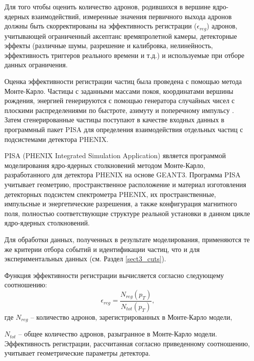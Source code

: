 Для того чтобы оценить количество адронов, родившихся в вершине ядро-ядерных взаимодействий, измеренные значения первичного выхода адронов должны быть скорректированы на эффективность регистрации ($\epsilon_{reg}$) адронов, учитывающей ограниченный аксептанс времяпролетной камеры, детекторные эффекты (различные шумы, разрешение и калибровка, нелинейность, эффективность триггеров реального времени и т.д.) и используемые при отборе данных ограничения.

Оценка эффективности регистрации частиц была проведена с помощью метода Монте-Карло.
Частицы с заданными массами покоя, координатами вершины рождения, энергией генерируются с помощью генератора  случайных чисел с плоскими распределениями по быстроте, азимуту и поперечному импульсу \pt. Затем сгенерированные частицы поступают в качестве входных данных в программный пакет PISA для определения взаимодействия отдельных частиц с подсистемами детектора PHENIX. 

PISA (PHENIX Integrated Simulation Application) является программой моделирования ядро-ядерных столкновений методом Монте-Карло, разработанного для детектора PHENIX на основе GEANT3.
Программа PISA учитывает геометрию, пространственное расположение и материал изготовления детекторных подсистем спектрометра PHENIX, их пространственные, импульсные и энергетические разрешения, а также конфигурация магнитного поля, полностью соответствующие структуре реальной установки в данном цикле ядро-ядерных столкновений.

Для обработки данных, полученных в результате моделирования, применяются те же критерии отбора событий и идентификации частиц, что и для экспериментальных данных (см. Раздел \ref{sect3_cuts}).

Функция эффективности регистрации вычисляется согласно следующему соотношению:
$$\epsilon_{reg} = \frac{N_{reg}(p_T)}{N_{tot}(p_T)},$$
где $N_{reg}$ -- количество адронов, зарегистрированных в Монте-Карло модели,

$N_{tot}$ -- общее количество адронов, разыгранное в Монте-Карло модели.
Эффективность регистрации, рассчитанная согласно приведенному соотношению, учитывает геометрические параметры детектора.

